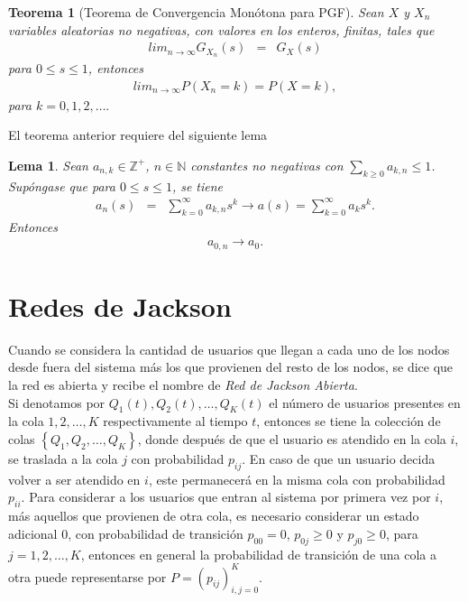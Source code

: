 \documentclass{article}
\newtheorem{Teo}{Teorema}[section]
\newtheorem{Lemma}{Lema}[section]
\newcommand{\nat}{\mathbb{N}}
\newcommand{\ent}{\mathbb{Z}}
\numberwithin{equation}{section}
\begin{document}
{\begin{Teo}[Teorema de Convergencia Mon\'otona para PGF]
Sean $X$ y $X_{n}$ variables aleatorias no negativas, con valores en los enteros, finitas, tales que
\begin{eqnarray*}
lim_{n\rightarrow\infty}G_{X_{n}}\left(s\right)&=&G_{X}\left(s\right)
\end{eqnarray*}
para $0\leq s\leq1$, entonces
\begin{eqnarray*}
lim_{n\rightarrow\infty}P\left(X_{n}=k\right)=P\left(X=k\right),
\end{eqnarray*}
para $k=0,1,2,\ldots.$
\end{Teo}

El teorema anterior requiere del siguiente lema

\begin{Lemma}
Sean $a_{n,k}\in\ent^{+}$, $n\in\nat$ constantes no negativas con $\sum_{k\geq0}a_{k,n}\leq1$. Sup\'ongase que para $0\leq s\leq1$,
se tiene
\begin{eqnarray*}
a_{n}\left(s\right)&=&\sum_{k=0}^{\infty}a_{k,n}s^{k}\rightarrow
a\left(s\right)=\sum_{k=0}^{\infty}a_{k}s^{k}.
\end{eqnarray*}
Entonces
\begin{eqnarray*}
a_{0,n}\rightarrow a_{0}.
\end{eqnarray*}
\end{Lemma}


\section{Redes de Jackson}
Cuando se considera la cantidad de
usuarios que llegan a cada uno de los nodos desde fuera del
sistema m\'as los que provienen del resto de los nodos, se dice
que la red es abierta y recibe el nombre de {\em Red de Jackson Abierta}.\\

Si denotamos por $Q_{1}\left(t\right),Q_{2}\left(t\right),\ldots,Q_{K}\left(t\right)$ el n\'umero de usuarios presentes en la cola $1,2,\ldots,K$ respectivamente al tiempo $t$, entonces se tiene la colecci\'on de colas $\left\{Q_{1},Q_{2},\ldots,Q_{K}\right\}$, donde despu\'es de que el usuario es atendido en la cola $i$, se traslada a la cola $j$ con probabilidad $p_{ij}$. En caso de que un usuario decida volver a ser atendido en $i$, este permanecer\'a en la misma cola con probabilidad $p_{ii}$. Para considerar a los usuarios que entran al sistema por primera vez por $i$, m\'as aquellos que provienen de otra cola, es necesario considerar un estado adicional $0$, con probabilidad de transici\'on $p_{00}=0$, $p_{0j}\geq0$ y $p_{j0}\geq0$, para $j=1,2,\ldots,K$, entonces en general la probabilidad de transici\'on de una cola a otra puede representarse por $P=\left(p_{ij}\right)_{i,j=0}^{K}$.\\

}
\end{document}
